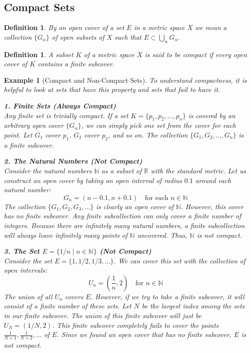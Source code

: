 \documentclass{article}
\theoremstyle{mythm}
\newtheorem{definition}[theorem]{Definition}
\newtheorem{example}[theorem]{Example}
\begin{document}
\subsection*{Compact Sets}

\begin{definition}
By an \textit{open cover} of a set $E$ in a metric space $X$ we mean a collection $\{G_\alpha\}$ of open subsets of $X$ such that $E \subset \bigcup_\alpha G_\alpha$.
\end{definition}

\begin{definition}
A subset $K$ of a metric space $X$ is said to be \textit{compact} if every open cover of $K$ contains a \textit{finite subcover}.
\end{definition}

\begin{example}[Compact and Non-Compact Sets]
To understand compactness, it is helpful to look at sets that have this property and sets that fail to have it.

\textbf{1. Finite Sets (Always Compact)} \\
Any finite set is trivially compact. If a set $K = \{p_1, p_2, \dots, p_n\}$ is covered by an arbitrary open cover $\{G_\alpha\}$, we can simply pick one set from the cover for each point. Let $G_1$ cover $p_1$, $G_2$ cover $p_2$, and so on. The collection $\{G_1, G_2, \dots, G_n\}$ is a finite subcover.

\textbf{2. The Natural Numbers (Not Compact)} \\
Consider the natural numbers $\mathbb{N}$ as a subset of $\mathbb{R}$ with the standard metric. Let us construct an open cover by taking an open interval of radius $0.1$ around each natural number:
\[ G_n = (n - 0.1, n + 0.1) \quad \text{for each } n \in \mathbb{N} \]
The collection $\{G_1, G_2, G_3, \dots\}$ is clearly an open cover of $\mathbb{N}$. However, this cover has no finite subcover. Any finite subcollection can only cover a finite number of integers. Because there are infinitely many natural numbers, a finite subcollection will always leave infinitely many points of $\mathbb{N}$ uncovered. Thus, $\mathbb{N}$ is not compact.

\textbf{3. The Set $E = \{1/n \mid n \in \mathbb{N}\}$ (Not Compact)} \\
Consider the set $E = \{1, 1/2, 1/3, \dots\}$. We can cover this set with the collection of open intervals:
\[ U_n = \left(\frac{1}{n}, 2\right) \quad \text{for } n \in \mathbb{N} \]
The union of all $U_n$ covers $E$. However, if we try to take a finite subcover, it will consist of a finite number of these sets. Let $N$ be the largest index among the sets in our finite subcover. The union of this finite subcover will just be $U_N = (1/N, 2)$. This finite subcover completely fails to cover the points $\frac{1}{N+1}, \frac{1}{N+2}, \dots$ of $E$. Since we found an open cover that has no finite subcover, $E$ is not compact.


\end{example}
\end{document}
